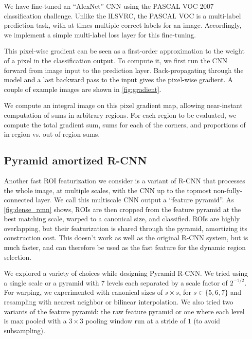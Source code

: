 We have fine-tuned an ``AlexNet'' \cite{Krizhevsky-NIPS-2012} CNN using the PASCAL VOC 2007 classification challenge.
Unlike the ILSVRC, the PASCAL VOC is a multi-label prediction task, with at times multiple correct labels for an image.
Accordingly, we implement a simple multi-label loss layer for this fine-tuning.

This pixel-wise gradient can be seen as a first-order approximation to the weight of a pixel in the classification output.
To compute it, we first run the CNN forward from image input to the prediction layer.
Back-propagating through the model and a last backward pass to the input gives the pixel-wise gradient.
A couple of example images are shown in \autoref{fig:gradient}.

We compute an integral image on this pixel gradient map, allowing near-instant computation of sums in arbitrary regions.
For each region to be evaluated, we compute the total gradient sum, sums for each of the corners, and proportions of in-region vs. out-of-region sums.


\subsection{Pyramid amortized R-CNN}\label{sec:dense}

Another fast ROI featurization we consider is a variant of R-CNN that processes the whole image, at multiple scales, with the CNN up to the topmost non-fully-connected layer.
We call this multiscale CNN output a ``feature pyramid''.
As \autoref{fig:dense_rcnn} shows, ROIs are then cropped from the feature pyramid at the best matching scale, warped to a canonical size, and classified.
ROIs are highly overlapping, but their featurization is shared through the pyramid, amortizing its construction cost.
This doesn't work as well as the original R-CNN system, but is much faster, and can therefore be used as the fast feature for the dynamic region selection.


We explored a variety of choices while designing Pyramid R-CNN.
We tried using a single scale or a pyramid with 7 levels each separated by a scale factor of $2^{-1/2}$.
For warping, we experimented with canonical sizes of $s \times s$, for $s \in \{5,6,7\}$ and resampling with nearest neighbor or bilinear interpolation.
We also tried two variants of the feature pyramid: the raw feature pyramid or one where each level is max pooled with a $3 \times 3$ pooling window run at a stride of $1$ (to avoid subsampling).

